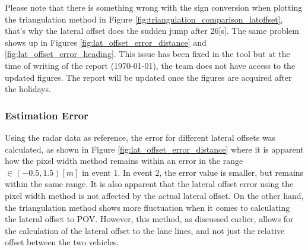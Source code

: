 Please note that there is something wrong with the sign conversion when plotting the triangulation method in Figure \ref{fig:triangulation_comparison_latoffset}, that's why the lateral offset does the sudden jump after 26[s]. The same problem shows up in Figures \ref{fig:lat_offset_error_distance} and \ref{fig:lat_offset_error_heading}. This issue has been fixed in the tool but at the time of writing of the report (\today), the team does not have access to the updated figures. The report will be updated once the figures are acquired after the holidays.

\subsubsection{Estimation Error}

Using the radar data as reference, the error for different lateral offsets was calculated, as shown in Figure \ref{fig:lat_offset_error_distance} where it is apparent how the pixel width method remains within an error in the range $\in(-0.5, 1.5)[m]$ in event 1. In event 2, the error value is smaller, but remains within the same range. It is also apparent that the lateral offset error using the pixel width method is not affected by the actual lateral offset. On the other hand, the triangulation method shows more fluctuation when it comes to calculating the lateral offset to POV. However, this method, as discussed earlier, allows for the calculation of the lateral offset to the lane lines, and not just the relative offset between the two vehicles.

